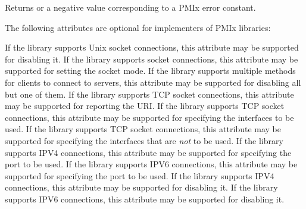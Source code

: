 Returns  or a negative value corresponding to a \ac{PMIx} error constant.

\optattrstart
The following attributes are optional for implementers of \ac{PMIx} libraries:

 If the library supports Unix socket connections, this attribute may be supported for disabling it.
\pasteAttributeItemEnd{}
 If the library supports socket connections, this attribute may be supported for setting the socket mode.
\pasteAttributeItemEnd{}
 If the library supports multiple methods for clients to connect to servers, this attribute may be supported for disabling all but one of them.
\pasteAttributeItemEnd{}
 If the library supports TCP socket connections, this attribute may be supported for reporting the URI.
\pasteAttributeItemEnd{}
 If the library supports TCP socket connections, this attribute may be supported for specifying the interfaces to be used.
\pasteAttributeItemEnd{}
 If the library supports TCP socket connections, this attribute may be supported for specifying the interfaces that are \textit{not} to be used.
\pasteAttributeItemEnd{}
 If the library supports IPV4 connections, this attribute may be supported for specifying the port to be used.
\pasteAttributeItemEnd{}
 If the library supports IPV6 connections, this attribute may be supported for specifying the port to be used.
\pasteAttributeItemEnd{}
 If the library supports IPV4 connections, this attribute may be supported for disabling it.
\pasteAttributeItemEnd{}
 If the library supports IPV6 connections, this attribute may be supported for disabling it.
\pasteAttributeItemEnd{}
%

